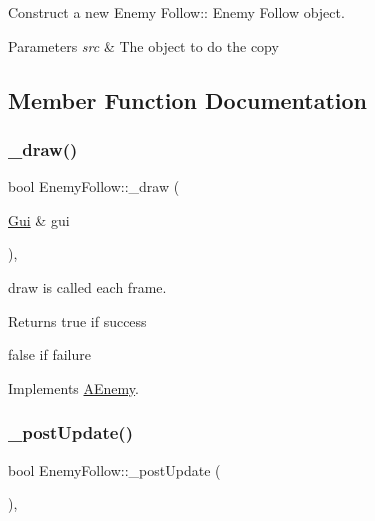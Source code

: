 Construct a new Enemy Follow\+:\+: Enemy Follow object. 


\begin{DoxyParams}{Parameters}
{\em src} & The object to do the copy \\
\hline
\end{DoxyParams}


\subsection{Member Function Documentation}
\mbox{\label{class_enemy_follow_a6fefcf7802be9f3a3b7d8e3b9a0b1704}} 
\subsubsection{\texorpdfstring{\+\_\+draw()}{\_draw()}}
{\footnotesize\ttfamily bool Enemy\+Follow\+::\+\_\+draw (\begin{DoxyParamCaption}\item[{\hyperlink{class_gui}{Gui} \&}]{gui }\end{DoxyParamCaption})\hspace{0.3cm}{\ttfamily [protected]}, {\ttfamily [virtual]}}



draw is called each frame. 

\begin{DoxyReturn}{Returns}
true if success 

false if failure 
\end{DoxyReturn}


Implements \hyperlink{class_a_enemy_a70e3638b5ed8ecea2a087ffe16510dd2}{A\+Enemy}.

\mbox{\label{class_enemy_follow_a7a52e753882b9bbf5cab062c606cd8d0}} 
\subsubsection{\texorpdfstring{\+\_\+post\+Update()}{\_postUpdate()}}
{\footnotesize\ttfamily bool Enemy\+Follow\+::\+\_\+post\+Update (\begin{DoxyParamCaption}{ }\end{DoxyParamCaption})\hspace{0.3cm}{\ttfamily [protected]}, {\ttfamily [virtual]}}



